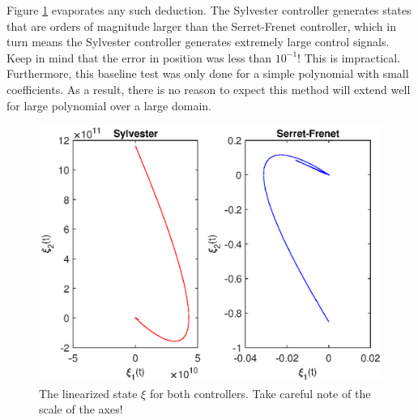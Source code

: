 \documentclass[oneside, 11pt]{book}
\begin{document}
Figure \ref{fig:tfl_compare_state} evaporates any such deduction. The Sylvester controller generates states that are orders of magnitude larger than the Serret-Frenet controller, which in turn means the Sylvester controller generates extremely large control signals. Keep in mind that the error in position was less than $10^{-1}$! This is impractical. Furthermore, this baseline test was only done for a simple polynomial with small coefficients. As a result, there is no reason to expect this method will extend well for large polynomial over a large domain.

\begin{figure}[!htbp]
    \centering
    \includegraphics{images/tfl_compare_state.eps}
    \caption{The linearized state $\xi$ for both controllers. Take careful note of the scale of the axes!}
    \label{fig:tfl_compare_state}
\end{figure}
\end{document}
